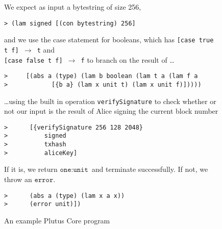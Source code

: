 \documentclass[../main.tex]{subfiles}
\begin{document}
\begin{figure*}
We expect as input a bytestring of size 256, 
\begin{lstlisting}[basicstyle=\ttfamily,mathescape]
> (lam signed [(con bytestring) 256]
\end{lstlisting}
and we use the case statement for booleans, which has \texttt{[case true t f] $\rightarrow$ t} and \\ \texttt{[case false t f] $\rightarrow$ f} to branch on the result of \ldots
\begin{lstlisting}[basicstyle=\ttfamily,mathescape]
>     [(abs a (type) (lam b boolean (lam t a (lam f a
>            [{b a} (lam x unit t) (lam x unit f)]))))
\end{lstlisting}
\ldots using the built in operation \texttt{verifySignature} to check whether or not our input is the result of Alice signing the current block number
\begin{lstlisting}[basicstyle=\ttfamily,mathescape]
>      [{verifySignature 256 128 2048}
>          signed
>          txhash
>          aliceKey]
\end{lstlisting}
If it is, we return $\texttt{one} : \texttt{unit}$ and terminate successfully. If not, we throw an $\texttt{error}$.
\begin{lstlisting}[basicstyle=\ttfamily]
>      (abs a (type) (lam x a x))
>      (error unit)])
\end{lstlisting}
\caption{An example Plutus Core program}
\end{figure*}
\end{document}

